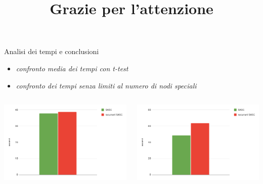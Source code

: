 \documentclass{beamer}
\begin{document}
\begin{tframe}{Analisi dei tempi e conclusioni}
  \begin{itemize}
    \item \textit{confronto media dei tempi con t-test}
    \item \textit{confronto dei tempi senza limiti al numero di nodi speciali}
  \end{itemize}

  \vspace{15mm}
  \centering
  \begin{columns}
    \includegraphics[scale = 0.2]{img/time1.png}

    \includegraphics[scale = 0.2]{img/time2.png}
  \end{columns}
\end{tframe}

\title{Grazie per l'attenzione}
\titlepageframe
\end{document}
